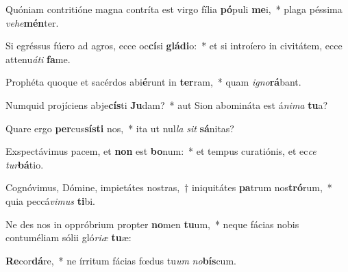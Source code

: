 \item Quóniam contritióne magna contríta est virgo fília \textbf{pó}puli \textbf{me}i,~* plaga péssima \textit{ve}\textit{he}\textbf{mén}ter.
\item Si egréssus fúero ad agros, ecce oc\textbf{cí}si \textbf{glá}\textbf{di}o:~* et si introíero in civitátem, ecce attenu\textit{á}\textit{ti} \textbf{fa}me.
\item Prophéta quoque et sacérdos abi\textbf{é}runt in \textbf{ter}ram,~* quam \textit{i}\textit{gno}\textbf{rá}bant.
\item Numquid projíciens abje\textbf{cís}ti \textbf{Ju}dam?~* aut Sion abomináta est á\textit{ni}\textit{ma} \textbf{tu}a?
\item Quare ergo \textbf{per}cus\textbf{sís}\textbf{ti} nos,~* ita ut nul\textit{la} \textit{sit} \textbf{sá}nitas?
\item Exspectávimus pacem, et \textbf{non} est \textbf{bo}num:~* et tempus curatiónis, et ec\textit{ce} \textit{tur}\textbf{bá}tio.
\item Cognóvimus, Dómine, impietátes nostras,~† iniquitátes \textbf{pa}trum nos\textbf{tró}rum,~* quia peccá\textit{vi}\textit{mus} \textbf{ti}bi.
\item Ne des nos in oppróbrium propter \textbf{no}men \textbf{tu}um,~* neque fácias nobis contuméliam sólii gló\textit{ri}\textit{æ} \textbf{tu}æ:
\item \textbf{Re}cor\textbf{dá}re,~* ne írritum fácias fœdus tu\textit{um} \textit{no}\textbf{bís}cum.
